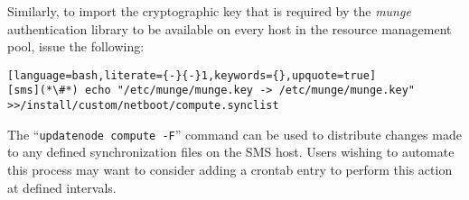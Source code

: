 \noindent Similarly, to import the
cryptographic
key
that is required by the {\em munge}
authentication library to be available on every host in the resource management
pool, issue the following:

\begin{lstlisting}[language=bash,literate={-}{-}1,keywords={},upquote=true]
[sms](*\#*) echo "/etc/munge/munge.key -> /etc/munge/munge.key" >>/install/custom/netboot/compute.synclist
\end{lstlisting}

\begin{center}
\begin{tcolorbox}[]
\small
The ``\texttt{updatenode compute -F}'' command can be used to distribute changes made to any
defined synchronization files on the SMS host. Users wishing to automate this process may
want to consider adding a crontab entry to perform this action at defined intervals.
\end{tcolorbox}
\end{center}
